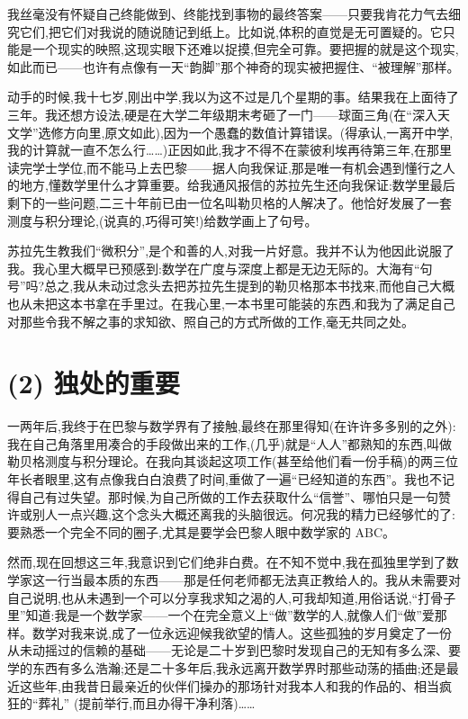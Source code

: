 我丝毫没有怀疑自己终能做到、终能找到事物的最终答案——只要我肯花力气去细究它们,把它们对我说的随说随记到纸上。比如说,体积的直觉是无可置疑的。它只能是一个现实的映照,这现实眼下还难以捉摸,但完全可靠。要把握的就是这个现实,如此而已——也许有点像有一天“韵脚”那个神奇的现实被把握住、“被理解”那样。

动手的时候,我十七岁,刚出中学,我以为这不过是几个星期的事。结果我在上面待了三年。我还想方设法,硬是在大学二年级期末考砸了一门——球面三角(在“深入天文学”选修方向里,原文如此),因为一个愚蠢的数值计算错误。(得承认,一离开中学,我的计算就一直不怎么行……)正因如此,我才不得不在蒙彼利埃再待第三年,在那里读完学士学位,而不能马上去巴黎——据人向我保证,那是唯一有机会遇到懂行之人的地方,懂数学里什么才算重要。给我通风报信的苏拉先生还向我保证:数学里最后剩下的一些问题,二三十年前已由一位名叫勒贝格的人解决了。他恰好发展了一套测度与积分理论,(说真的,巧得可笑!)给数学画上了句号。

 苏拉先生教我们“微积分”,是个和善的人,对我一片好意。我并不认为他因此说服了我。我心里大概早已预感到:数学在广度与深度上都是无边无际的。大海有“句号”吗?总之,我从未动过念头去把苏拉先生提到的勒贝格那本书找来,而他自己大概也从未把这本书拿在手里过。在我心里,一本书里可能装的东西,和我为了满足自己对那些令我不解之事的求知欲、照自己的方式所做的工作,毫无共同之处。

\section{(2) 独处的重要}

一两年后,我终于在巴黎与数学界有了接触,最终在那里得知(在许许多多别的之外):我在自己角落里用凑合的手段做出来的工作,(几乎)就是“人人”都熟知的东西,叫做勒贝格测度与积分理论。在我向其谈起这项工作(甚至给他们看一份手稿)的两三位年长者眼里,这有点像我白白浪费了时间,重做了一遍“已经知道的东西”。我也不记得自己有过失望。那时候,为自己所做的工作去获取什么“信誉”、哪怕只是一句赞许或别人一点兴趣,这个念头大概还离我的头脑很远。何况我的精力已经够忙的了:要熟悉一个完全不同的圈子,尤其是要学会巴黎人眼中数学家的 ABC。

然而,现在回想这三年,我意识到它们绝非白费。在不知不觉中,我在孤独里学到了数学家这一行当最本质的东西——那是任何老师都无法真正教给人的。我从未需要对自己说明,也从未遇到一个可以分享我求知之渴的人,可我却知道,用俗话说,“打骨子里”知道:我是一个数学家——一个在完全意义上“做”数学的人,就像人们“做”爱那样。数学对我来说,成了一位永远迎候我欲望的情人。这些孤独的岁月奠定了一份从未动摇过的信赖的基础——无论是二十岁到巴黎时发现自己的无知有多么深、要学的东西有多么浩瀚;还是二十多年后,我永远离开数学界时那些动荡的插曲;还是最近这些年,由我昔日最亲近的伙伴们操办的那场针对我本人和我的作品的、相当疯狂的“葬礼”
(提前举行,而且办得干净利落)……

